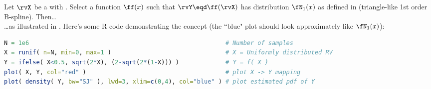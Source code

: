 \begin{example}
\label{ex:ppy_N1}
Let $\rvX$ be a  with .
Select a function $\ff(x)$ such that $\rvY\eqd\ff(\rvX)$ has distribution $\fN_1(x)$
as defined in  (triangle-like 1st order B-spline). Then\ldots
{}
\\\ldots as illustrated in .
Here's some R code demonstrating the concept (the ``blue" plot should look approximately like $\fN_1(x)$):
\begin{lstlisting}[language=R]
N = 1e6                                                       # Number of samples
X = runif( n=N, min=0, max=1 )                                # X = Uniformly distributed RV
Y = ifelse( X<0.5, sqrt(2*X), (2-sqrt(2*(1-X))) )             # Y = f( X )
plot( X, Y, col="red" )                                       # plot X -> Y mapping
plot( density( Y, bw="SJ" ), lwd=3, xlim=c(0,4), col="blue" ) # plot estimated pdf of Y
\end{lstlisting}
\end{example}
